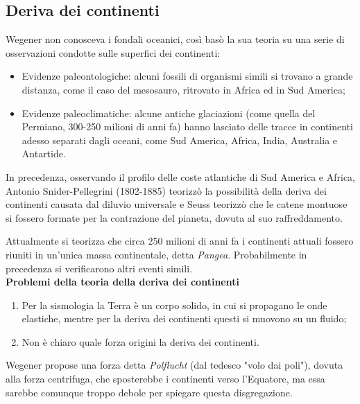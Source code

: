 \documentclass[a4paper,12pt]{book}
\begin{document}
\subsection{\textcolor{colore2}{Deriva dei continenti}}

Wegener non conosceva i fondali oceanici, così basò la sua teoria su una serie di osservazioni condotte sulle superfici dei continenti:

\begin{itemize}
\item Evidenze paleontologiche: alcuni fossili di organismi simili si trovano a grande distanza, come il caso del mesosauro, ritrovato in Africa ed in Sud America;
\item Evidenze paleoclimatiche: alcune antiche glaciazioni (come quella del Permiano, 300-250 milioni di anni fa) hanno lasciato delle tracce in continenti adesso separati dagli oceani, come Sud America, Africa, India, Australia e Antartide.
\end{itemize}

\noindent
In precedenza, osservando il profilo delle coste atlantiche di Sud America e Africa, Antonio Snider-Pellegrini (1802-1885) teorizzò la possibilità della deriva dei continenti causata dal diluvio universale e Seuss teorizzò che le catene montuose si fossero formate per la contrazione del pianeta, dovuta al suo raffreddamento.

Attualmente si teorizza che circa 250 milioni di anni fa i continenti attuali fossero riuniti in un'unica massa continentale, detta \textit{Pangea}.
Probabilmente in precedenza si verificarono altri eventi simili.\\

\noindent
\textbf{Problemi della teoria della deriva dei continenti}

\begin{enumerate}
    \item Per la sismologia la Terra è un corpo solido, in cui si propagano le onde elastiche, mentre per la deriva dei continenti questi si muovono su un fluido;
    \item Non è chiaro quale forza origini la deriva dei continenti.
\end{enumerate}

\noindent
Wegener propose una forza detta \textit{Polflucht} (dal tedesco "volo dai poli"), dovuta alla forza centrifuga, che sposterebbe i continenti verso l'Equatore, ma essa sarebbe comunque troppo debole per spiegare questa disgregazione.
\end{document}
